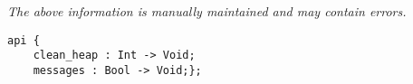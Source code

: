 \label{api:Heapcleaner\_Control}

{\tiny \it The above information is manually maintained and may contain errors.}
\begin{verbatim}
api {
    clean_heap : Int -> Void;
    messages : Bool -> Void;};
\end{verbatim}
